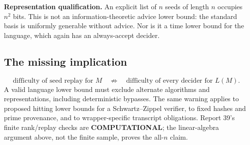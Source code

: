 \documentclass[11pt]{article}
\begin{document}
\textbf{Representation qualification.} An explicit list of $n$ seeds of
length $n$ occupies $n^2$ bits. This is not an information-theoretic advice
lower bound: the standard basis is uniformly generable without advice.
Nor is it a time lower bound for the language, which again has an
always-accept decider.

\subsection*{The missing implication}
\[
\boxed{\text{difficulty of seed replay for }M
       \quad\not\Rightarrow\quad
       \text{difficulty of every decider for }L(M).}
\]
A valid language lower bound must exclude alternate algorithms and
representations, including deterministic bypasses. The same warning applies
to proposed hitting lower bounds for a Schwartz--Zippel verifier, to fixed
hashes and prime provenance, and to wrapper-specific transcript obligations.
Report 39's finite rank/replay checks are \textbf{COMPUTATIONAL}; the
linear-algebra argument above, not the finite sample, proves the all-$n$ claim.

\newpage
\end{document}
